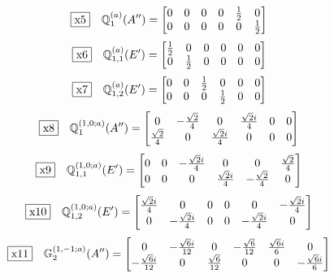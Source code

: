\documentclass[fleqn,10pt,landscape]{jsarticle}
\begin{document}
\begin{dmath*}
\fbox{x5}\quad \mathbb{Q}_{1}^{(a)}(A^{\prime\prime})=\begin{bmatrix} 0 & 0 & 0 & 0 & \frac{1}{2} & 0 \\ 0 & 0 & 0 & 0 & 0 & \frac{1}{2} \end{bmatrix}
\end{dmath*}
\begin{dmath*}
\fbox{x6}\quad \mathbb{Q}_{1,1}^{(a)}(E^{\prime})=\begin{bmatrix} \frac{1}{2} & 0 & 0 & 0 & 0 & 0 \\ 0 & \frac{1}{2} & 0 & 0 & 0 & 0 \end{bmatrix}
\end{dmath*}
\begin{dmath*}
\fbox{x7}\quad \mathbb{Q}_{1,2}^{(a)}(E^{\prime})=\begin{bmatrix} 0 & 0 & \frac{1}{2} & 0 & 0 & 0 \\ 0 & 0 & 0 & \frac{1}{2} & 0 & 0 \end{bmatrix}
\end{dmath*}
\begin{dmath*}
\fbox{x8}\quad \mathbb{Q}_{1}^{(1,0;a)}(A^{\prime\prime})=\begin{bmatrix} 0 & - \frac{\sqrt{2}}{4} & 0 & \frac{\sqrt{2} i}{4} & 0 & 0 \\ \frac{\sqrt{2}}{4} & 0 & \frac{\sqrt{2} i}{4} & 0 & 0 & 0 \end{bmatrix}
\end{dmath*}
\begin{dmath*}
\fbox{x9}\quad \mathbb{Q}_{1,1}^{(1,0;a)}(E^{\prime})=\begin{bmatrix} 0 & 0 & - \frac{\sqrt{2} i}{4} & 0 & 0 & \frac{\sqrt{2}}{4} \\ 0 & 0 & 0 & \frac{\sqrt{2} i}{4} & - \frac{\sqrt{2}}{4} & 0 \end{bmatrix}
\end{dmath*}
\begin{dmath*}
\fbox{x10}\quad \mathbb{Q}_{1,2}^{(1,0;a)}(E^{\prime})=\begin{bmatrix} \frac{\sqrt{2} i}{4} & 0 & 0 & 0 & 0 & - \frac{\sqrt{2} i}{4} \\ 0 & - \frac{\sqrt{2} i}{4} & 0 & 0 & - \frac{\sqrt{2} i}{4} & 0 \end{bmatrix}
\end{dmath*}
\begin{dmath*}
\fbox{x11}\quad \mathbb{G}_{2}^{(1,-1;a)}(A^{\prime\prime})=\begin{bmatrix} 0 & - \frac{\sqrt{6} i}{12} & 0 & - \frac{\sqrt{6}}{12} & \frac{\sqrt{6} i}{6} & 0 \\ - \frac{\sqrt{6} i}{12} & 0 & \frac{\sqrt{6}}{12} & 0 & 0 & - \frac{\sqrt{6} i}{6} \end{bmatrix}
\end{dmath*}
\end{document}
